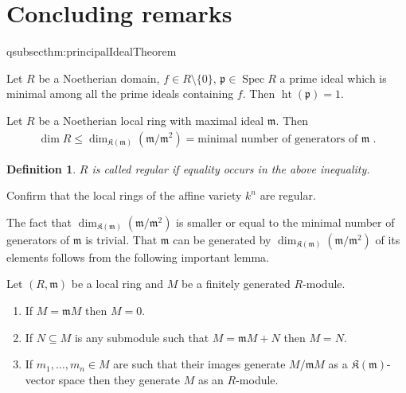 \documentclass[DIV=14,parskip=full,pointednumbers]{scrartcl}
\newenvironment{alphanumerate}{\begin{enumerate}[label={$(\alph*)$},ref=\curthm]}{\end{enumerate}}
\theoremstyle{cthm}
\theoremstyle{cvarthm}
\theoremstyle{cdef}
\newtheorem{defi}{Definition}[subsection]
\newcommand{\lbl}[1]{
	\label{#1}
	\ifmmode
	\expandafter\xdef\csname eqsubsec#1\endcsname{\thesubsection}
	\fi
}
\newcommand{\KK}{\mathfrak K}
\newcommand{\mm}{\mathfrak{m}}
\newcommand{\pp}{\mathfrak{p}}
\newcommand{\Spec}{\operatorname{Spec}}
\newcommand{\hoehe}{\operatorname{ht}}
\begin{document}
\setcounter{cor}{0}
\setcounter{defi}{0}
\setcounter{rem}{0}
\setcounter{fact}{0}
\section*{Concluding remarks}
	\begin{thm}\lbl{thm:principalIdealTheorem}
		Let $R$ be a Noetherian domain, $f\in R\setminus\{0\}$, $\pp\in \Spec R$ a prime ideal which is minimal among all the prime ideals containing $f$. Then $\hoehe(\pp) = 1$.
	\end{thm}
	\begin{cor}
		Let $R$ be a Noetherian local ring with maximal ideal $\mm$. Then
		\begin{align*}
			\dim R\leq\dim_{\KK(\mm)}(\mm/\mm^2)=\text{minimal number of generators of }\mm\;. 
		\end{align*}
	\end{cor}
	\begin{defi}
		$R$ is called regular if equality occurs in the above inequality.
	\end{defi}
	\begin{exc}
		Confirm that the local rings of the affine variety $k^n$ are regular.
	\end{exc}
	The fact that $\dim_{\KK(\mm)}(\mm/\mm^2)$ is smaller or equal to the minimal number of generators of $\mm$ is trivial. That $\mm$ can be generated by $\dim_{\KK(\mm)}(\mm/\mm^2)$ of its elements follows from the following important lemma.
	\begin{lem}
		Let $(R,\mm)$ be a local ring and $M$ be a finitely generated $R$-module.
		\begin{alphanumerate}
		\item
			If $M = \mm M$ then $M=0$.
		\item 
			If $N\subseteq M$ is any submodule such that $M = \mm M +N$ then $M=N$.
		\item 
			If $m_1,\ldots, m_n\in M$ are such that their images generate $M/\mm M$ as a $\KK(\mm)$-vector space then they generate $M$ as an $R$-module.
		\end{alphanumerate}

	\end{lem}
\end{document}
